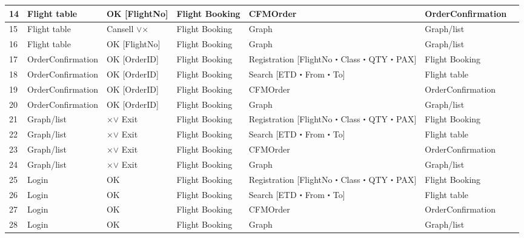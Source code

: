 \begin{table}[t]
\begin{tabular}{p{1 em}|p{7 em}|p{10.5 em}|p{7 em}|p{10.5 em}|p{7 em}|p{7 em}}
\hline
    14    & Flight table & OK [FlightNo] & Flight Booking  & CFMOrder & OrderConfirmation &  \\
\hline
    15    & Flight table & Cansell $\lor$× & Flight Booking  & Graph & Graph/list &  \\
\hline
    16    & Flight table & OK [FlightNo] & Flight Booking  & Graph & Graph/list &  \\
\hline
    17    & OrderConfirmation & OK [OrderID] & Flight Booking  & Registration [FlightNo・Class・QTY・PAX] & Flight Booking  &  \\
\hline
    18    & OrderConfirmation & OK [OrderID] & Flight Booking  & Search [ETD・From・To] & Flight table &  \\
\hline
    19    & OrderConfirmation & OK [OrderID] & Flight Booking  & CFMOrder & OrderConfirmation &  \\
\hline
    20    & OrderConfirmation & OK [OrderID] & Flight Booking  & Graph & Graph/list &  \\
\hline
    21    & Graph/list & ×$\lor$ Exit & Flight Booking  & Registration [FlightNo・Class・QTY・PAX] & Flight Booking  &  \\
\hline
    22    & Graph/list & ×$\lor$ Exit & Flight Booking  & Search [ETD・From・To] & Flight table &  \\
\hline
    23    & Graph/list & ×$\lor$ Exit & Flight Booking  & CFMOrder & OrderConfirmation &  \\
\hline
    24    & Graph/list & ×$\lor$ Exit & Flight Booking  & Graph & Graph/list &  \\
\hline
    25    & Login & OK    & Flight Booking  & Registration [FlightNo・Class・QTY・PAX] & Flight Booking  &  \\
\hline
    26    & Login & OK    & Flight Booking  & Search [ETD・From・To] & Flight table &  \\
\hline
    27    & Login & OK    & Flight Booking  & CFMOrder & OrderConfirmation &  \\
\hline
    28    & Login & OK    & Flight Booking  & Graph & Graph/list &  \\
\hline

    \end{tabular}%
  \label{tab:STDS1}%
\end{table}%
